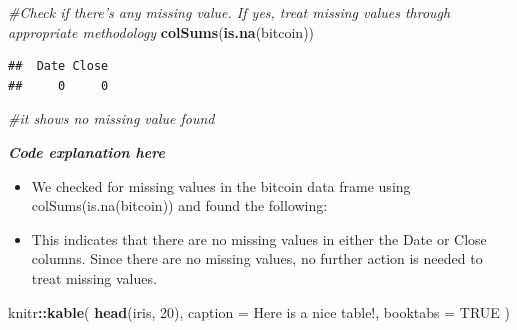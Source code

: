 \documentclass[
]{book}
\newenvironment{Shaded}{\begin{snugshade}}{\end{snugshade}}
\newcommand{\AttributeTok}[1]{\textcolor[rgb]{0.13,0.29,0.53}{#1}}
\newcommand{\CommentTok}[1]{\textcolor[rgb]{0.56,0.35,0.01}{\textit{#1}}}
\newcommand{\ConstantTok}[1]{\textcolor[rgb]{0.56,0.35,0.01}{#1}}
\newcommand{\DecValTok}[1]{\textcolor[rgb]{0.00,0.00,0.81}{#1}}
\newcommand{\FunctionTok}[1]{\textcolor[rgb]{0.13,0.29,0.53}{\textbf{#1}}}
\newcommand{\NormalTok}[1]{#1}
\newcommand{\SpecialCharTok}[1]{\textcolor[rgb]{0.81,0.36,0.00}{\textbf{#1}}}
\newcommand{\StringTok}[1]{\textcolor[rgb]{0.31,0.60,0.02}{#1}}
\providecommand{\tightlist}{%
  \setlength{\itemsep}{0pt}\setlength{\parskip}{0pt}}
\begin{document}
\begin{Shaded}
\begin{Highlighting}[]
\CommentTok{\#Check if there’s any missing value. If yes, treat missing values through appropriate methodology}
\FunctionTok{colSums}\NormalTok{(}\FunctionTok{is.na}\NormalTok{(bitcoin))}
\end{Highlighting}
\end{Shaded}

\begin{verbatim}
##  Date Close 
##     0     0
\end{verbatim}

\begin{Shaded}
\begin{Highlighting}[]
\CommentTok{\#it shows no missing value found}
\end{Highlighting}
\end{Shaded}

\emph{\textbf{Code explanation here}}

\begin{itemize}
\tightlist
\item
  We checked for missing values in the bitcoin data frame using colSums(is.na(bitcoin)) and found the following:
\item
  This indicates that there are no missing values in either the Date or Close columns. Since there are no missing values, no further action is needed to treat missing values.
\end{itemize}

\begin{Shaded}
\begin{Highlighting}[]
\NormalTok{knitr}\SpecialCharTok{::}\FunctionTok{kable}\NormalTok{(}
  \FunctionTok{head}\NormalTok{(iris, }\DecValTok{20}\NormalTok{), }\AttributeTok{caption =} \StringTok{\textquotesingle{}Here is a nice table!\textquotesingle{}}\NormalTok{,}
  \AttributeTok{booktabs =} \ConstantTok{TRUE}
\NormalTok{)}
\end{Highlighting}
\end{Shaded}
\end{document}
